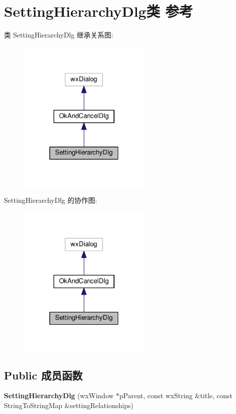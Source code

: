 \hypertarget{class_setting_hierarchy_dlg}{\section{Setting\+Hierarchy\+Dlg类 参考}
\label{class_setting_hierarchy_dlg}
}


类 Setting\+Hierarchy\+Dlg 继承关系图\+:
\nopagebreak
\begin{figure}[H]
\begin{center}
\leavevmode
\includegraphics[width=184pt]{class_setting_hierarchy_dlg__inherit__graph}
\end{center}
\end{figure}


Setting\+Hierarchy\+Dlg 的协作图\+:
\nopagebreak
\begin{figure}[H]
\begin{center}
\leavevmode
\includegraphics[width=184pt]{class_setting_hierarchy_dlg__coll__graph}
\end{center}
\end{figure}
\subsection*{Public 成员函数}
\begin{DoxyCompactItemize}
\item 
\hypertarget{class_setting_hierarchy_dlg_a0c35ec427ce58d9337228e69bd93f225}{{\bfseries Setting\+Hierarchy\+Dlg} (wx\+Window $\ast$p\+Parent, const wx\+String \&title, const String\+To\+String\+Map \&setting\+Relationships)}\label{class_setting_hierarchy_dlg_a0c35ec427ce58d9337228e69bd93f225}

\end{DoxyCompactItemize}
